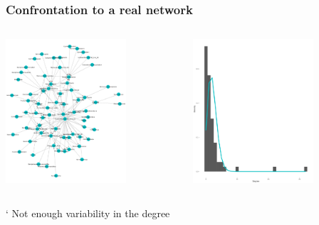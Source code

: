 \documentclass[compress,10pt]{beamer}
\begin{document}
\begin{frame}\frametitle{Confrontation to a real network}
\begin{columns}
\begin{column}{0.5\textwidth}
\centering
\includegraphics[width=0.7\textwidth]{plots/network_Herlzier(NC)}
\end{column}
\begin{column}{0.5\textwidth}
\centering
\includegraphics[width=0.7\textwidth]{plots/degree_Herlzier(NC)}
\end{column}
\end{columns}


\bigskip
\centering

`
\centering
Not enough variability in the degree
\end{frame}
\end{document}
